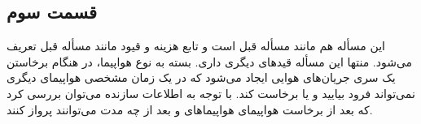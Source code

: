 \subsection{قسمت سوم}
این مسأله هم مانند مسأله قبل است و تابع هزینه و قیود مانند مسأله قبل تعریف می‌شود. منتها این مسأله قیدهای دیگری داری. بسته به نوع هواپیما، در هنگام برخاستن یک سری جریان‌های هوایی ایجاد می‌شود که در یک زمان مشخصی هواپیمای دیگری نمی‌تواند فرود بیایید و یا برخاست کند. با توجه به اطلاعات سازنده می‌توان بررسی کرد که بعد از برخاست هواپیمای  هواپیماهای
و
بعد از چه مدت می‌توانند پرواز کنند.
